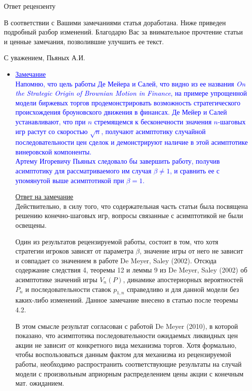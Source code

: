 \documentclass[12pt]{extarticle}
\begin{document}
\begin{center}
{\Large Ответ рецензенту}
\end{center}

В соответствии с Вашими замечаниями статья доработана. Ниже приведен подробный
разбор изменений. Благодарю Вас за внимательное прочтение статьи и ценные
замечания, позволившие улучшить ее текст.

\begin{flushright}
С уважением, Пьяных А.И.
\end{flushright}


\begin{itemize}
\item%

  \textcolor{blue}{%
    \underline{Замечание}\\
    Напомню, что цель работы Де Мейера и Салей, что видно из ее названия
    \textit{On the Strategic Origin of Brownian Motion in Finance}, на примере
    упрощенной модели биржевых торгов продемонстрировать возможность
    стратегического происхождения броуновского движения в финансах. Де Мейер и
    Салей устанавливают, что при $n$ стремящемся к бесконечности значения
    $n$-шаговых игр растут со скоростью $\sqrt{n}$, получают асимптотику
    случайной последовательности цен сделок и демонстрируют наличие в этой
    асимптотике винеровской компоненты.\\
    Артему Игоревичу Пьяных следовало бы завершить работу, получив асимптотику
    для рассматриваемого им случая $\beta \neq 1$, и сравнить ее с упомянутой
    выше асимптотикой при $\beta = 1$.}
  
  \underline{Ответ на замечание}\\
  Действительно, в силу того, что содержательная часть статьи была посвящена
  решению конечно-шаговых игр, вопросы связанные с асимптотикой не были
  освещены.
  
  Один из результатов рецензируемой работы, состоит в том, что хотя стратегии
  игроков зависят от параметра $\beta$, значение игры от него не зависит и
  совпадает со значением в работе De Meyer, Saley (2002). Отсюда содержание
  следствия 4, теоремы 12 и леммы 9 из De Meyer, Saley (2002) об асимптотике
  значений игры $V_n(P)$, динамике апостериорных вероятностей $P_n$ и
  последовательности ставок $p_{1,n}$ справедливо и для данной модели без
  каких-либо изменений. Данное замечание внесено в статью после теоремы 4.2.
  
  В этом смысле результат согласован с работой De Meyer (2010), в которой
  показано, что асимптотика последовательности ожидаемых ликвидных цен акции не
  зависит от конкретного вида механизма торгов. Хотя формально, чтобы
  воспользоваться данным фактом для механизма из рецензируемой работы,
  необходимо распространить соответствующие результаты на случай модели с
  произвольным априорным распределением цены акции с конечным мат. ожиданием.
  

\end{itemize}
\end{document}
